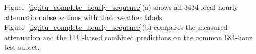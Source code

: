 Figure~\ref{fig:itu_complete_hourly_sequence}(a) shows all 3434
local hourly attenuation observations with their weather labels.
Figure~\ref{fig:itu_complete_hourly_sequence}(b) compares the
measured attenuation and the ITU-based combined predictions on
the common 684-hour test subset.
